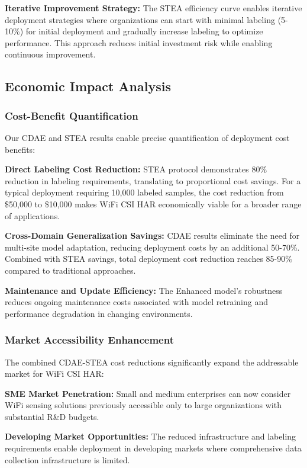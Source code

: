 \textbf{Iterative Improvement Strategy:} The STEA efficiency curve enables iterative deployment strategies where organizations can start with minimal labeling (5-10\%) for initial deployment and gradually increase labeling to optimize performance. This approach reduces initial investment risk while enabling continuous improvement.

\subsection{Economic Impact Analysis}

\subsubsection{Cost-Benefit Quantification}

Our CDAE and STEA results enable precise quantification of deployment cost benefits:

\textbf{Direct Labeling Cost Reduction:} STEA protocol demonstrates 80\% reduction in labeling requirements, translating to proportional cost savings. For a typical deployment requiring 10,000 labeled samples, the cost reduction from \$50,000 to \$10,000 makes WiFi CSI HAR economically viable for a broader range of applications.

\textbf{Cross-Domain Generalization Savings:} CDAE results eliminate the need for multi-site model adaptation, reducing deployment costs by an additional 50-70\%. Combined with STEA savings, total deployment cost reduction reaches 85-90\% compared to traditional approaches.

\textbf{Maintenance and Update Efficiency:} The Enhanced model's robustness reduces ongoing maintenance costs associated with model retraining and performance degradation in changing environments.

\subsubsection{Market Accessibility Enhancement}

The combined CDAE-STEA cost reductions significantly expand the addressable market for WiFi CSI HAR:

\textbf{SME Market Penetration:} Small and medium enterprises can now consider WiFi sensing solutions previously accessible only to large organizations with substantial R\&D budgets.

\textbf{Developing Market Opportunities:} The reduced infrastructure and labeling requirements enable deployment in developing markets where comprehensive data collection infrastructure is limited.

